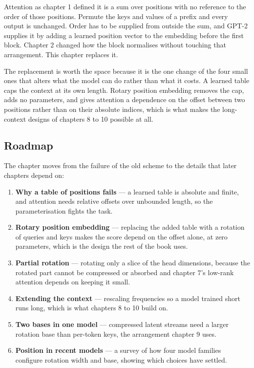 Attention as chapter 1 defined it is a sum over positions with no
reference to the order of those positions. Permute the keys and values
of a prefix and every output is unchanged. Order has to be supplied from
outside the sum, and GPT-2 supplies it by adding a learned position
vector to the embedding before the first block. Chapter 2 changed how
the block normalises without touching that arrangement. This chapter
replaces it.

The replacement is worth the space because it is the one change of the
four small ones that alters what the model can do rather than what it
costs. A learned table caps the context at its own length. Rotary
position embedding removes the cap, adds no parameters, and gives
attention a dependence on the offset between two positions rather than
on their absolute indices, which is what makes the long-context designs
of chapters 8 to 10 possible at all.

\hypertarget{roadmap}{%
\subsection{Roadmap}\label{roadmap}}

The chapter moves from the failure of the old scheme to the details that
later chapters depend on:

\begin{enumerate}
\def\labelenumi{\arabic{enumi}.}
\tightlist
\item
  \textbf{Why a table of positions fails} --- a learned table is
  absolute and finite, and attention needs relative offsets over
  unbounded length, so the parameterisation fights the task.
\item
  \textbf{Rotary position embedding} --- replacing the added table with
  a rotation of queries and keys makes the score depend on the offset
  alone, at zero parameters, which is the design the rest of the book
  uses.
\item
  \textbf{Partial rotation} --- rotating only a slice of the head
  dimensions, because the rotated part cannot be compressed or absorbed
  and chapter 7's low-rank attention depends on keeping it small.
\item
  \textbf{Extending the context} --- rescaling frequencies so a model
  trained short runs long, which is what chapters 8 to 10 build on.
\item
  \textbf{Two bases in one model} --- compressed latent streams need a
  larger rotation base than per-token keys, the arrangement chapter 9
  uses.
\item
  \textbf{Position in recent models} --- a survey of how four model
  families configure rotation width and base, showing which choices have
  settled.
\end{enumerate}


